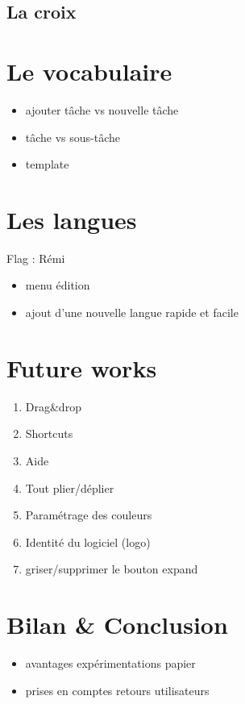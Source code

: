 \documentclass[11pt]{article}
\begin{document}
\subsection{La croix}


\section{Le vocabulaire}

\begin{itemize}
\item ajouter tâche vs nouvelle tâche
\item tâche vs sous-tâche
\item template
\end{itemize}


\section{Les langues}
Flag : Rémi

\begin{itemize}
\item menu édition
\item ajout d'une nouvelle langue rapide et facile
\end{itemize}


\section{Future works}
\begin{enumerate}
\item Drag\&drop
\item Shortcuts
\item Aide
\item Tout plier/déplier
\item Paramétrage des couleurs
\item Identité du logiciel (logo)
\item griser/supprimer le bouton expand
\end{enumerate}


\section{Bilan \& Conclusion}
\begin{itemize}
\item avantages expérimentations papier
\item prises en comptes retours utilisateurs
\end{itemize}
\end{document}
